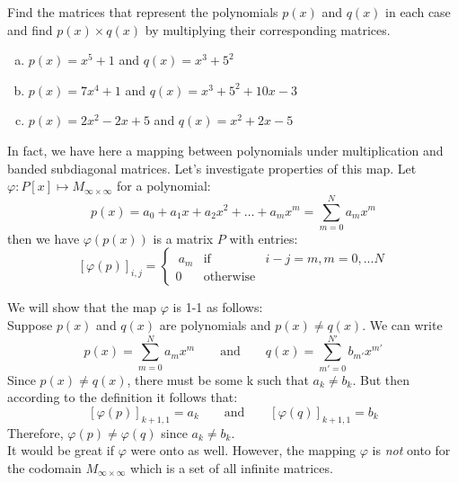 \begin{exercise}{}
Find the matrices that represent the polynomials $p(x)$ and $q(x)$ in each case and find $p(x)\times q(x)$ by multiplying their corresponding matrices.
\begin{enumerate}[(a)]
	\item
	$p(x)=x^5+1$ and $q(x)=x^3+5^2$
	\item
	$p(x)=7x^4+1$ and $q(x)=x^3+5^2+10x-3$
	\item
	$p(x)=2x^2-2x+5$ and $q(x)=x^2+2x-5$
\end{enumerate}
\end{exercise}
In fact, we have here a mapping  between polynomials under multiplication and banded subdiagonal matrices.  Let's investigate properties of this map.
Let $\varphi : P[x] \mapsto M_{\infty \times \infty}$ for a polynomial: \[p(x) = a_0+a_1x+a_2x^2+\dots+a_mx^m=\sum^ {N}_{m=0} a_{m}x^{m}\] then we have $\varphi(p(x))$ is a matrix $P$ with entries:\\
\[[\varphi(p)]_{i,j} = \left\{\begin{array}{rcl}\ a_m  &\mbox{if}&   i - j = m,   m=0,... N \\  0 &\mbox{otherwise}& \end{array}\right.\]

We will show that the map $\varphi$ is  1-1 as follows:\\
Suppose $p(x)$ and $q(x)$ are polynomials and $p(x) \neq q(x)$. We can write
\[p(x) = \sum^ {N}_{m=0} a_{m}x^{m}\qquad \text{and} \qquad q(x) = \sum^ {N'}_{m'=0} b_{m'}x^{m'}\]
Since $p(x) \neq q(x)$, there must be some k such that $ a_k \neq b_k $.
But then according to the definition it follows that:
\[[\varphi(p)]_{k+1, 1} = a_k \qquad \text{and} \qquad [\varphi(q)]_{k+1, 1} = b_k\]
Therefore, $\varphi(p) \neq \varphi(q)$ since $a_k \neq b_k$.\\
It would be great if $\varphi$ were onto as well. However, the mapping $\varphi$ is \emph{not} onto for the codomain $M_{\infty \times \infty}$ which is a set of all infinite matrices.

